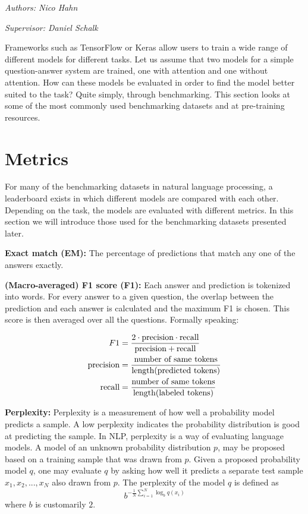 \documentclass[]{krantz}
\begin{document}
\emph{Authors: Nico Hahn}

\emph{Supervisor: Daniel Schalk}

Frameworks such as TensorFlow or Keras allow users to train a wide range of different models for different tasks. Let us assume that two models for a simple question-answer system are trained, one with attention and one without attention. How can these models be evaluated in order to find the model better suited to the task? Quite simply, through benchmarking. This section looks at some of the most commonly used benchmarking datasets and at pre-training resources.

\hypertarget{metrics}{%
\section{Metrics}\label{metrics}}

For many of the benchmarking datasets in natural language processing, a leaderboard exists in which different models are compared with each other. Depending on the task, the models are evaluated with different metrics. In this section we will introduce those used for the benchmarking datasets presented later.

\textbf{Exact match (EM):} The percentage of predictions that match any one of the answers exactly.

\textbf{(Macro-averaged) F1 score (F1):} Each answer and prediction is tokenized into words. For every answer to a given question, the overlap between the prediction and each answer is calculated and the maximum F1 is chosen. This score is then averaged over all the questions. Formally speaking:

\[
\begin{aligned}
F1 &= \frac{2 \cdot \hbox{precision}\cdot\hbox{recall}}{\hbox{precision}+\hbox{recall}} \\
\hbox{precision} &= \frac{\hbox{number of same tokens}}{\hbox{length(predicted tokens)}} \\
\hbox{recall} &= \frac{\hbox{number of same tokens}}{\hbox{length(labeled tokens)}} 
\end{aligned}
\]

\textbf{Perplexity:} Perplexity is a measurement of how well a probability model predicts a sample. A low perplexity indicates the probability distribution is good at predicting the sample. In NLP, perplexity is a way of evaluating language models. A model of an unknown probability distribution \(p\), may be proposed based on a training sample that was drawn from \(p\). Given a proposed probability model \(q\), one may evaluate \(q\) by asking how well it predicts a separate test sample \(x_1, x_2, ..., x_N\) also drawn from \(p\). The perplexity of the model \(q\) is defined as
\[ b^{-\frac{1}{N}\sum_{i=1}^N\log_bq(x_i)} \]
where \(b\) is customarily \(2\). \citep{martinc2019supervised}
\end{document}
